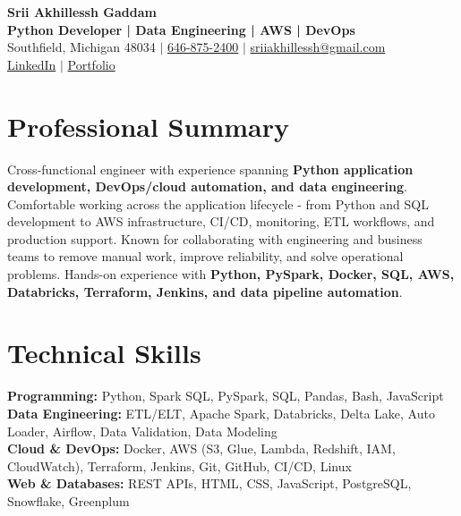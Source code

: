 \documentclass[letterpaper,10pt]{article}
\begin{document}
\fontsize{9.35pt}{10.45pt}\selectfont

\begin{center}
    {\LARGE \textbf{Srii Akhillessh Gaddam}} \\[-1pt]
    \textbf{Python Developer | Data Engineering | AWS | DevOps} \\[2pt]
    Southfield, Michigan 48034 $|$
    \href{tel:6468752400}{646-875-2400} $|$
    \href{mailto:sriiakhillessh@gmail.com}{sriiakhillessh@gmail.com} \\[1pt]
    \href{https://www.linkedin.com/in/srii-akhiilessh-gaddam-b48668191/}{LinkedIn} $|$
    \href{https://sriiakhillesshg.github.io/portfolio/}{Portfolio}
\end{center}
\vspace{-8pt}

\section{Professional Summary}
\small{Cross-functional engineer with experience spanning \textbf{Python application development, DevOps/cloud automation, and data engineering}. Comfortable working across the application lifecycle - from Python and SQL development to AWS infrastructure, CI/CD, monitoring, ETL workflows, and production support. Known for collaborating with engineering and business teams to remove manual work, improve reliability, and solve operational problems. Hands-on experience with \textbf{Python, PySpark, Docker, SQL, AWS, Databricks, Terraform, Jenkins, and data pipeline automation}.}

\section{Technical Skills}
\small{
\textbf{Programming:} Python, Spark SQL, PySpark, SQL, Pandas, Bash, JavaScript \\
\textbf{Data Engineering:} ETL/ELT, Apache Spark, Databricks, Delta Lake, Auto Loader, Airflow, Data Validation, Data Modeling \\
\textbf{Cloud \& DevOps:} Docker, AWS (S3, Glue, Lambda, Redshift, IAM, CloudWatch), Terraform, Jenkins, Git, GitHub, CI/CD, Linux \\
\textbf{Web \& Databases:} REST APIs, HTML, CSS, JavaScript, PostgreSQL, Snowflake, Greenplum
}
\end{document}
